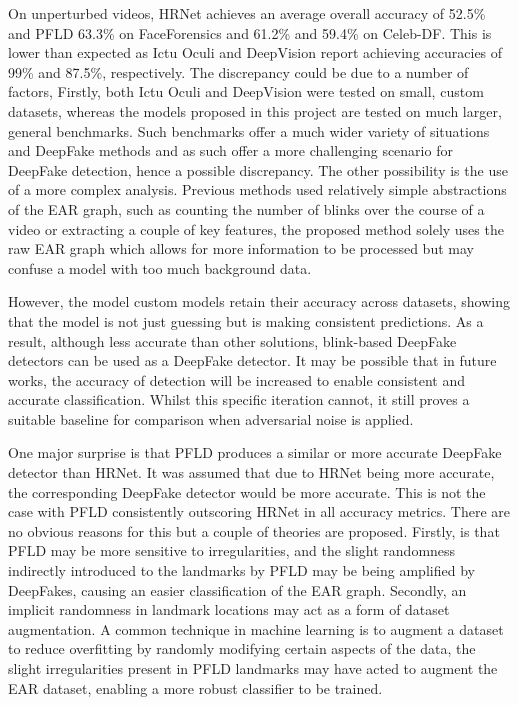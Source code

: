 On unperturbed videos, HRNet achieves an average overall accuracy of 52.5\% and PFLD 63.3\% on FaceForensics and 61.2\% and 59.4\% on Celeb-DF. This is lower than expected as Ictu Oculi and DeepVision report achieving accuracies of 99\%\cite{li2018ictu} and 87.5\%\cite{jung2020deepvision}, respectively. The discrepancy could be due to a number of factors, Firstly, both Ictu Oculi and DeepVision were tested on small, custom datasets, whereas the models proposed in this project are tested on much larger, general benchmarks. Such benchmarks offer a much wider variety of situations and DeepFake methods and as such offer a more challenging scenario for DeepFake detection, hence a possible discrepancy. The other possibility is the use of a more complex analysis. Previous methods used relatively simple abstractions of the EAR graph, such as counting the number of blinks over the course of a video or extracting a couple of key features, the proposed method solely uses the raw EAR graph which allows for more information to be processed but may confuse a model with too much background data. 

However, the model custom models retain their accuracy across datasets, showing that the model is not just guessing but is making consistent predictions. As a result, although less accurate than other solutions, blink-based DeepFake detectors can be used as a DeepFake detector. It may be possible that in future works, the accuracy of detection will be increased to enable consistent and accurate classification. Whilst this specific iteration cannot, it still proves a suitable baseline for comparison when adversarial noise is applied. 

One major surprise is that PFLD produces a similar or more accurate DeepFake detector than HRNet. It was assumed that due to HRNet being more accurate, the corresponding DeepFake detector would be more accurate. This is not the case with PFLD consistently outscoring HRNet in all accuracy metrics. There are no obvious reasons for this but a couple of theories are proposed. Firstly, is that PFLD may be more sensitive to irregularities, and the slight randomness indirectly introduced to the landmarks by PFLD may be being amplified by DeepFakes, causing an easier classification of the EAR graph. Secondly, an implicit randomness in landmark locations may act as a form of dataset augmentation. A common technique in machine learning is to augment a dataset to reduce overfitting by randomly modifying certain aspects of the data, the slight irregularities present in PFLD landmarks may have acted to augment the EAR dataset, enabling a more robust classifier to be trained.

